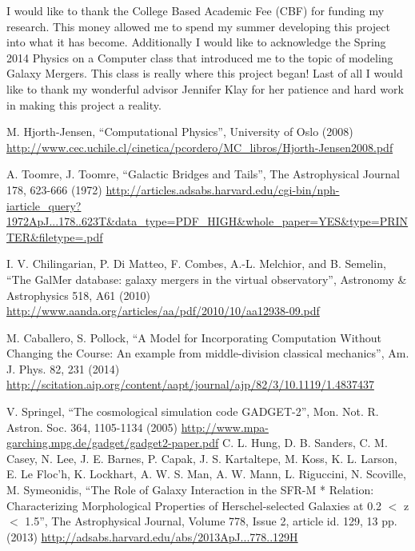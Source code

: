\documentclass[11pt]{article}
\begin{document}
\begin{acknowledgments}

I would like to thank the College Based Academic Fee (CBF) for funding my research.  This money allowed me to spend my summer developing this project into what it has become.  Additionally I would like to acknowledge the Spring 2014 Physics on a Computer class that introduced me to the topic of modeling Galaxy Mergers.  This class is really where this project began!  Last of all I would like to thank my wonderful advisor Jennifer Klay for her patience and hard work in making this project a reality.  

\end{acknowledgments}


\begin{thebibliography}{99}

 M. Hjorth-Jensen, ``Computational Physics'', University of Oslo (2008) \url{http://www.cec.uchile.cl/cinetica/pcordero/MC_libros/Hjorth-Jensen2008.pdf}

 A. Toomre, J. Toomre, ``Galactic Bridges and Tails'', The Astrophysical Journal 178, 623-666 (1972) \url{http://articles.adsabs.harvard.edu/cgi-bin/nph-iarticle_query?1972ApJ...178..623T&data_type=PDF_HIGH&whole_paper=YES&type=PRINTER&filetype=.pdf}

I. V. Chilingarian, P. Di Matteo, F. Combes, A.-L. Melchior, and B. Semelin, ``The GalMer database: galaxy mergers in the virtual observatory'', Astronomy \& Astrophysics 518, A61 (2010) \url{http://www.aanda.org/articles/aa/pdf/2010/10/aa12938-09.pdf}

 M. Caballero, S. Pollock, ``A Model for Incorporating Computation Without Changing the Course: An example from middle-division classical mechanics'', Am. J. Phys. 82, 231 (2014) \url{http://scitation.aip.org/content/aapt/journal/ajp/82/3/10.1119/1.4837437}

 V. Springel, ``The cosmological simulation code GADGET-2'', Mon. Not. R. Astron. Soc. 364, 1105-1134 (2005) \url{http://www.mpa-garching.mpg.de/gadget/gadget2-paper.pdf}	 
 C. L. Hung, D. B. Sanders, C. M. Casey, N. Lee, J. E. Barnes, P. Capak, J. S. Kartaltepe, M. Koss, K. L. Larson, E. Le Floc'h, K. Lockhart, A. W. S. Man, A. W. Mann, L. Riguccini, N. Scoville, M. Symeonidis, ``The Role of Galaxy Interaction in the SFR-M * Relation: Characterizing Morphological Properties of Herschel-selected Galaxies at 0.2 $<$ z $<$ 1.5'', The Astrophysical Journal, Volume 778, Issue 2, article id. 129, 13 pp. (2013) \url{http://adsabs.harvard.edu/abs/2013ApJ...778..129H}


\end{thebibliography}
\end{document}
